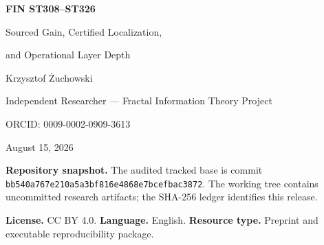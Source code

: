 \documentclass[11pt,a4paper]{article}
\begin{document}
\hypersetup{pageanchor=false}
\begin{titlepage}\centering
\vspace*{1cm}{\Large Fractal Information Theory Project\par}\vspace{.85cm}
{\huge\bfseries FIN ST308--ST326\par}\vspace{.35cm}
{\LARGE Sourced Gain, Certified Localization,\par}{\LARGE and Operational Layer Depth\par}
\vspace{.9cm}{\large Analytical, interval, and bounded computational research report\par}
\vfill{\Large Krzysztof \.{Z}uchowski\par}\vspace{.2cm}
{\large Independent Researcher --- Fractal Information Theory Project\par}
{\large ORCID: 0009-0002-0909-3613\par}\vspace{.75cm}
{\large August 15, 2026\par}\vspace{.25cm}{\large Release 10.78\par}\vfill
\begin{minipage}{.92\textwidth}\small
\textbf{Repository snapshot.} The audited tracked base is commit
\texttt{bb540a767e210a5a3bf816e4868e7bcefbac3872}. The working tree contains
uncommitted research artifacts; the SHA-256 ledger identifies this release.

\medskip\textbf{License.} CC BY 4.0. \quad \textbf{Language.} English. \quad
\textbf{Resource type.} Preprint and executable reproducibility package.
\end{minipage}\end{titlepage}
\hypersetup{pageanchor=true}
\end{document}
